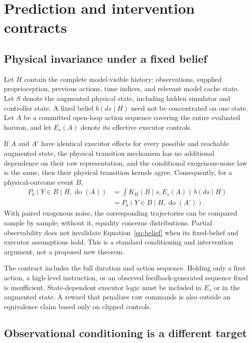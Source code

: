 \documentclass[11pt]{article}
\newcommand{\doop}{\operatorname{do}}
\begin{document}
\section{Prediction and intervention contracts}
\label{sec:contract}

\subsection{Physical invariance under a fixed belief}

Let $H$ contain the complete model-visible history: observations, supplied
proprioception, previous actions, time indices, and relevant model cache state.
Let $S$ denote the augmented physical state, including hidden simulator and
controller state. A fixed belief $b(ds\mid H)$ need not be concentrated on one
state. Let $A$ be a committed open-loop action sequence covering the entire
evaluated horizon, and let $E_s(A)$ denote its effective executor controls.

If $A$ and $A'$ have identical executor effects for every possible and reachable
augmented state, the physical transition mechanism has no additional dependence
on their raw representation, and the conditional exogenous-noise law is the
same, then their physical transition kernels agree. Consequently, for a
physical-outcome event $B$,
\begin{equation}
\begin{split}
 P_b(Y\in B\mid H,\doop(A))
 &= \int K_H(B\mid s,E_s(A))\,b(ds\mid H)\\
 &= P_b(Y\in B\mid H,\doop(A')).
\end{split}
\label{eq:belief}
\end{equation}
With paired exogenous noise, the corresponding trajectories can be compared
sample by sample; without it, equality concerns distributions. Partial
observability does not invalidate Equation~\ref{eq:belief} when its fixed-belief
and executor assumptions hold. This is a standard conditioning and
intervention argument, not a proposed new theorem.

The contract includes the full duration and action sequence. Holding only a
first action, a high-level instruction, or an observed feedback-generated
sequence fixed is insufficient. State-dependent executor logic must be
included in $E_s$ or in the augmented state. A reward that penalizes raw
commands is also outside an equivalence claim based only on clipped controls.

\subsection{Observational conditioning is a different target}
\end{document}
